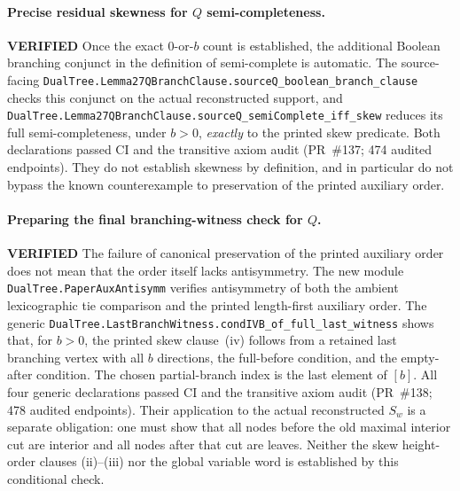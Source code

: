 \documentclass[11pt]{article}
\newcommand{\ok}{\textcolor{green!40!black}{\textbf{VERIFIED}}}
\newcommand{\lean}[1]{\texttt{#1}}
\begin{document}
\paragraph{Precise residual skewness for $Q$ semi-completeness.} \ok
Once the exact $0$-or-$b$ count is established, the additional
Boolean branching conjunct in the definition of semi-complete is
automatic. The source-facing
\lean{DualTree.Lemma27QBranchClause.sourceQ_boolean_branch_clause}
checks this conjunct on the actual reconstructed support, and
\lean{DualTree.Lemma27QBranchClause.sourceQ_semiComplete_iff_skew}
reduces its full semi-completeness, under $b>0$, \emph{exactly} to
the printed skew predicate.
Both declarations passed CI and the transitive axiom audit
(PR~\#137; 474 audited endpoints). They do not establish skewness by definition,
and in particular do not bypass the known counterexample to
preservation of the printed auxiliary order.

\paragraph{Preparing the final branching-witness check for $Q$.} \ok
The failure of canonical preservation of the printed auxiliary
order does not mean that the order itself lacks antisymmetry.
The new module \lean{DualTree.PaperAuxAntisymm} verifies
antisymmetry of both the ambient lexicographic tie comparison
and the printed length-first auxiliary order. The generic
\lean{DualTree.LastBranchWitness.condIVB_of_full_last_witness}
shows that, for $b>0$, the printed skew clause~(iv) follows
from a retained last branching vertex with all $b$ directions,
the full-before condition, and the empty-after condition.
The chosen partial-branch index is the last element of $[b]$.
All four generic declarations passed CI and the transitive axiom
audit (PR~\#138; 478 audited endpoints). Their application to
the actual reconstructed $S_w$ is a separate obligation:
one must show that all nodes before the old maximal interior
cut are interior and all nodes after that cut are leaves.
Neither the skew height-order clauses (ii)--(iii) nor the
global variable word is established by this conditional check.
\end{document}
